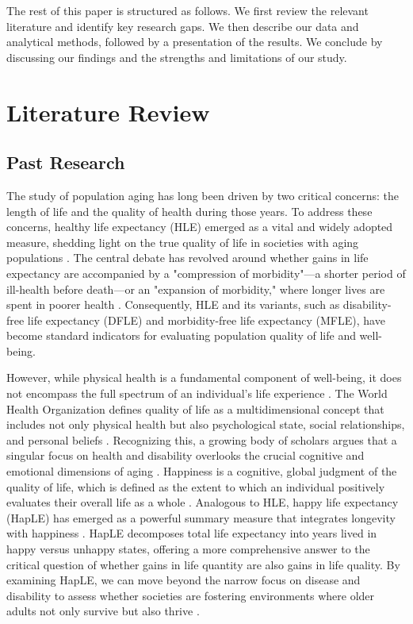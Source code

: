 \documentclass[12pt, a4paper]{article}
\begin{document}
The rest of this paper is structured as follows. We first review the relevant literature and identify key research gaps. We then describe our data and analytical methods, followed by a presentation of the results. We conclude by discussing our findings and the strengths and limitations of our study.

\section{Literature Review}

\subsection{Past Research}
The study of population aging has long been driven by two critical concerns: the length of life and the quality of health during those years. To address these concerns, healthy life expectancy (HLE) emerged as a vital and widely adopted measure, shedding light on the true quality of life in societies with aging populations \autocite{sanders.1964.measuring}. The central debate has revolved around whether gains in life expectancy are accompanied by a "compression of morbidity"—a shorter period of ill-health before death—or an "expansion of morbidity," where longer lives are spent in poorer health \autocite{fries.1980.aging,gruenberg.1977.failures}. Consequently, HLE and its variants, such as disability-free life expectancy (DFLE) and morbidity-free life expectancy (MFLE), have become standard indicators for evaluating population quality of life and well-being.

However, while physical health is a fundamental component of well-being, it does not encompass the full spectrum of an individual's life experience \autocite{yang.2008.long}. The World Health Organization defines quality of life as a multidimensional concept that includes not only physical health but also psychological state, social relationships, and personal beliefs \autocite{thewhoqolgroup.1998.development}. Recognizing this, a growing body of scholars argues that a singular focus on health and disability overlooks the crucial cognitive and emotional dimensions of aging \autocite{george.2010.still}. Happiness is a cognitive, global judgment of the quality of life, which is defined as the extent to which an individual positively evaluates their overall life as a whole \autocite{veenhoven.1996.study}. Analogous to HLE, happy life expectancy (HapLE) has emerged as a powerful summary measure that integrates longevity with happiness \autocite{yang.2008.long}. HapLE decomposes total life expectancy into years lived in happy versus unhappy states, offering a more comprehensive answer to the critical question of whether gains in life quantity are also gains in life quality. By examining HapLE, we can move beyond the narrow focus on disease and disability to assess whether societies are fostering environments where older adults not only survive but also thrive \autocite{yang.2008.long,wan.2024.socioeconomic}.
\end{document}
